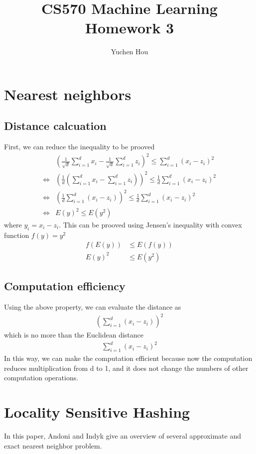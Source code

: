 \documentclass[12pt]{article}
\begin{document}
\title{CS570 Machine Learning Homework 3}
\author{Yuchen Hou}
\maketitle

\section{Nearest neighbors}
\subsection{Distance calcuation}
First, we can reduce the inequality to be prooved
\begin{align}
  & ( \frac{1}{\sqrt{d}} \sum_{i=1}^{d}x_i - \frac{1}{\sqrt{d}} \sum_{i=1}^{d}z_i )^2 \leq \sum_{i=1}^{d}(x_i - z_i)^2 \\
  \iff & ( \frac{1}{d} ( \sum_{i=1}^{d}x_i - \sum_{i=1}^{d}z_i) )^2 \leq \frac{1}{d} \sum_{i=1}^{d} (x_i - z_i)^2 \\
  \iff & ( \frac{1}{d} \sum_{i=1}^{d}(x_i-z_i) )^2 \leq \frac{1}{d} \sum_{i=1}^{d} (x_i - z_i)^2 \\
  \iff & E(y)^2 \leq E(y^2)
\end{align}
where $y_i=x_i-z_i$. This can be prooved using Jensen's inequality with convex function $ f(y) = y^2 $
\begin{align}
  f(E(y)) &\leq E(f(y)) \\
  E(y)^2 &\leq E(y^2)
\end{align}
\subsection{Computation efficiency}
Using the above property, we can evaluate the distance as
\begin{align}
  ( \sum_{i=1}^{d}(x_i-z_i) )^2
\end{align}
which is no more than the Euclidean distance
\begin{align}
  \sum_{i=1}^{d} (x_i - z_i)^2
\end{align}
In this way, we can make the computation efficient because now the computation reduces multiplication from d to 1, and it does not change the numbers of other computation operations.
\section{Locality Sensitive Hashing}
In this paper, Andoni and Indyk give an overview of several approximate and exact nearest neighbor problem.
\end{document}
